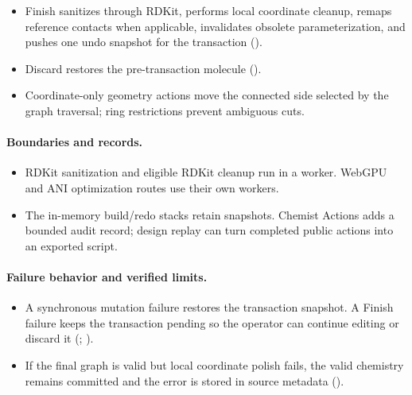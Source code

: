 \documentclass[11pt]{article}
\begin{document}
\begin{small}
\begin{itemize}[leftmargin=*]
\item Finish sanitizes through RDKit, performs local coordinate cleanup, remaps reference contacts when applicable, invalidates obsolete parameterization, and pushes one undo snapshot for the transaction ().

\item Discard restores the pre-transaction molecule ().

\item Coordinate-only geometry actions move the connected side selected by the graph traversal; ring restrictions prevent ambiguous cuts.

\end{itemize}

\paragraph{Boundaries and records.}

\begin{itemize}[leftmargin=*]

\item RDKit sanitization and eligible RDKit cleanup run in a worker. WebGPU and ANI optimization routes use their own workers.

\item The in-memory build/redo stacks retain snapshots. Chemist Actions adds a bounded audit record; design replay can turn completed public actions into an exported script.

\end{itemize}

\paragraph{Failure behavior and verified limits.}

\begin{itemize}[leftmargin=*]

\item A synchronous mutation failure restores the transaction snapshot. A Finish failure keeps the transaction pending so the operator can continue editing or discard it (; ).

\item If the final graph is valid but local coordinate polish fails, the valid chemistry remains committed and the error is stored in source metadata ().


\end{itemize}
\end{small}
\end{document}
